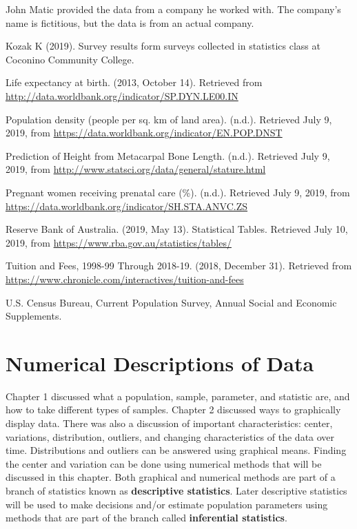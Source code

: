 \documentclass[]{book}
\begin{document}
John Matic provided the data from a company he worked with. The company's name is fictitious, but the data is from an actual company.

Kozak K (2019). Survey results form surveys collected in statistics class at Coconino Community College.

Life expectancy at birth. (2013, October 14). Retrieved from
\url{http://data.worldbank.org/indicator/SP.DYN.LE00.IN}

Population density (people per sq. km of land area). (n.d.). Retrieved July 9, 2019, from \url{https://data.worldbank.org/indicator/EN.POP.DNST}

Prediction of Height from Metacarpal Bone Length. (n.d.). Retrieved July 9, 2019, from \url{http://www.statsci.org/data/general/stature.html}

Pregnant women receiving prenatal care (\%). (n.d.). Retrieved July 9, 2019, from \url{https://data.worldbank.org/indicator/SH.STA.ANVC.ZS}

Reserve Bank of Australia. (2019, May 13). Statistical Tables. Retrieved July 10, 2019, from \url{https://www.rba.gov.au/statistics/tables/}

Tuition and Fees, 1998-99 Through 2018-19. (2018, December 31). Retrieved from \url{https://www.chronicle.com/interactives/tuition-and-fees}

U.S. Census Bureau, Current Population Survey, Annual Social and Economic Supplements.

\hypertarget{numerical-descriptions-of-data}{%
\chapter{Numerical Descriptions of Data}\label{numerical-descriptions-of-data}}

Chapter 1 discussed what a population, sample, parameter, and statistic are, and how to take different types of samples. Chapter 2 discussed ways to graphically display data. There was also a discussion of important characteristics: center, variations, distribution, outliers, and changing characteristics of the data over time. Distributions and outliers can be answered using graphical means. Finding the center and variation can be done using numerical methods that will be discussed in this chapter. Both graphical and numerical methods are part of a branch of statistics known as \textbf{descriptive statistics}. Later descriptive statistics will be used to make decisions and/or estimate population parameters using methods that are part of the branch called \textbf{inferential statistics}.
\end{document}
